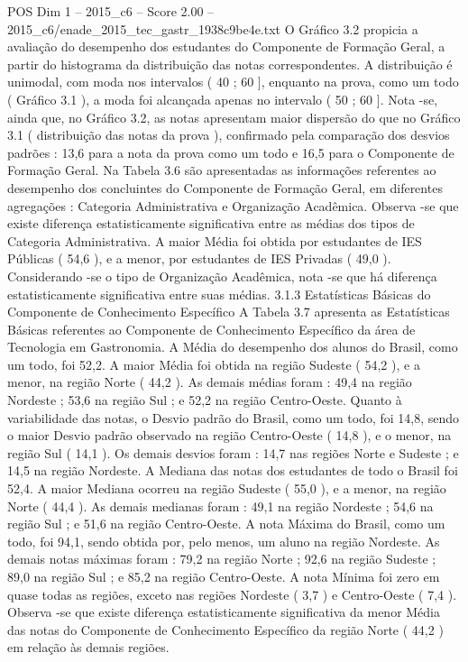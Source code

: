 \begin{textsample}{POS Dim 1 – 2015\_c6 – Score 2.00 – 2015\_c6/enade\_2015\_tec\_gastr\_1938c9be4e.txt}
O Gráfico 3.2 propicia a avaliação do desempenho dos estudantes do Componente de Formação Geral, a partir do histograma da distribuição das notas correspondentes.
A distribuição é unimodal, com moda nos intervalos ( 40 ; 60 ], enquanto na prova, como um todo ( Gráfico 3.1 ), a moda foi alcançada apenas no intervalo ( 50 ; 60 ].
Nota -se, ainda que, no Gráfico 3.2, as notas apresentam maior dispersão do que no Gráfico 3.1 ( distribuição das notas da prova ), confirmado pela comparação dos desvios padrões : 13,6 para a nota da prova como um todo e 16,5 para o Componente de Formação Geral.
Na Tabela 3.6 são apresentadas as informações referentes ao desempenho dos concluintes do Componente de Formação Geral, em diferentes agregações : Categoria Administrativa e Organização Acadêmica.
Observa -se que existe diferença estatisticamente significativa entre as médias dos tipos de Categoria Administrativa.
A maior Média foi obtida por estudantes de IES Públicas ( 54,6 ), e a menor, por estudantes de IES Privadas ( 49,0 ).
Considerando -se o tipo de Organização Acadêmica, nota -se que há diferença estatisticamente significativa entre suas médias. 3.1.3 Estatísticas Básicas do Componente de Conhecimento Específico A Tabela 3.7 apresenta as Estatísticas Básicas referentes ao Componente de Conhecimento Específico da área de Tecnologia em Gastronomia.
A Média do desempenho dos alunos do Brasil, como um todo, foi 52,2.
A maior Média foi obtida na região Sudeste ( 54,2 ), e a menor, na região Norte ( 44,2 ).
As demais médias foram : 49,4 na região Nordeste ; 53,6 na região Sul ; e 52,2 na região Centro-Oeste.
Quanto à variabilidade das notas, o Desvio padrão do Brasil, como um todo, foi 14,8, sendo o maior Desvio padrão observado na região Centro-Oeste ( 14,8 ), e o menor, na região Sul ( 14,1 ).
Os demais desvios foram : 14,7 nas regiões Norte e Sudeste ; e 14,5 na região Nordeste.
A Mediana das notas dos estudantes de todo o Brasil foi 52,4.
A maior Mediana ocorreu na região Sudeste ( 55,0 ), e a menor, na região Norte ( 44,4 ).
As demais medianas foram : 49,1 na região Nordeste ; 54,6 na região Sul ; e 51,6 na região Centro-Oeste.
A nota Máxima do Brasil, como um todo, foi 94,1, sendo obtida por, pelo menos, um aluno na região Nordeste.
As demais notas máximas foram : 79,2 na região Norte ; 92,6 na região Sudeste ; 89,0 na região Sul ; e 85,2 na região Centro-Oeste.
A nota Mínima foi zero em quase todas as regiões, exceto nas regiões Nordeste ( 3,7 ) e Centro-Oeste ( 7,4 ).
Observa -se que existe diferença estatisticamente significativa da menor Média das notas do Componente de Conhecimento Específico da região Norte ( 44,2 ) em relação às demais regiões.

\end{textsample}
